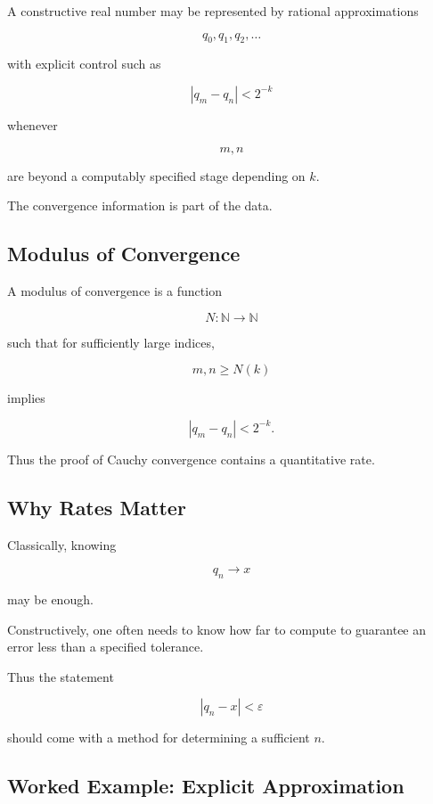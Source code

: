 A constructive real number may be represented by rational approximations

\[
q_0,q_1,q_2,\ldots
\]

with explicit control such as

\[
\boxed{
|q_m-q_n|
<
2^{-k}
}
\]

whenever

\[
m,n
\]

are beyond a computably specified stage depending on \(k\).

The convergence information is part of the data.

\subsection{Modulus of Convergence}
\label{subsec:modulus-of-convergence}

A modulus of convergence is a function

\[
N:\mathbb{N}\to\mathbb{N}
\]

such that for sufficiently large indices,

\[
m,n\geq N(k)
\]

implies

\[
\boxed{
|q_m-q_n|
<
2^{-k}.
}
\]

Thus the proof of Cauchy convergence contains a quantitative rate.

\subsection{Why Rates Matter}
\label{subsec:why-rates-matter-constructive}

Classically, knowing

\[
q_n\to x
\]

may be enough.

Constructively, one often needs to know how far to compute to guarantee an
error less than a specified tolerance.

Thus the statement

\[
\boxed{
|q_n-x|<\varepsilon
}
\]

should come with a method for determining a sufficient \(n\).

\subsection{Worked Example: Explicit Approximation}
\label{subsec:worked-explicit-approximation}

